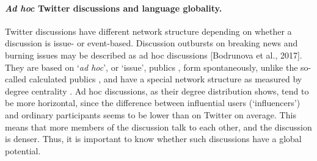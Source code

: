 \paragraph{\textit{Ad hoc} Twitter discussions and language globality.} Twitter discussions have different network structure depending on whether a discussion is issue- or event-based. Discussion outbursts on breaking news and burning issues may be described as ad hoc discussions [Bodrunova et al., 2017]. They are based on ‘\textit{ad hoc}’, or ‘issue’, publics \cite{Habermas,BrunsBurgess,Papacharissi}, form spontaneously, unlike the so-called calculated publics \cite{BrunsBurgess}, and have a special network structure as measured by degree centrality \cite{BodrunovaBlekanov}. Ad hoc discussions, as their degree distribution shows, tend to be more horizontal, since the difference between influential users (‘influencers’) and ordinary participants seems to be lower than on Twitter on average. This means that more members of the discussion talk to each other, and the discussion is denser. Thus, it is important to know whether such discussions have a global potential.

